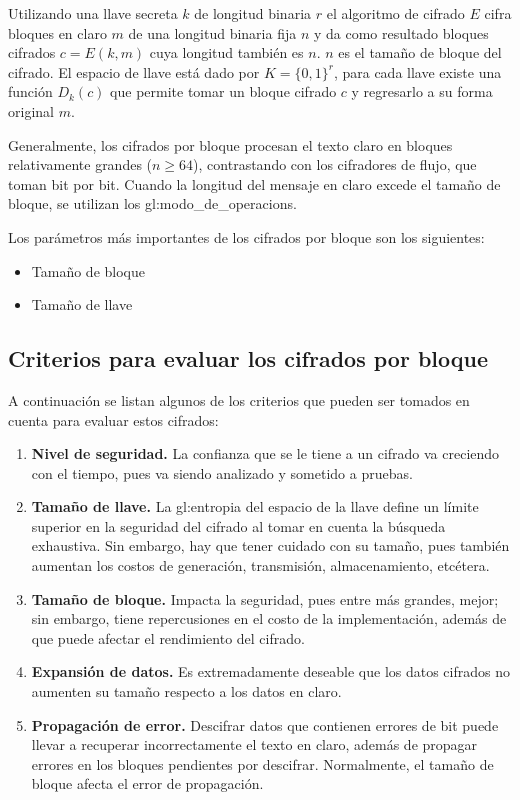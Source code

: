 Utilizando una llave secreta $k$ de longitud binaria $r$ el algoritmo de
cifrado $E$ cifra bloques en claro $m$ de una longitud binaria fija $n$ y
da como resultado bloques cifrados $c = E (k,m)$ cuya longitud también es
$n$. $n$ es el tamaño de bloque del cifrado.
El espacio de llave está dado por $K = \{0,1\}^r$, para cada llave existe una
función $D_k(c)$ que permite tomar un bloque cifrado $c$ y regresarlo a su
forma original $m$.

Generalmente, los cifrados por bloque procesan el texto claro en bloques
relativamente grandes ($n \geq 64$), contrastando con los cifradores de
flujo, que toman bit por bit. Cuando la longitud del mensaje en claro excede
el tamaño de bloque, se utilizan los \glspl{gl:modo_de_operacion}.

Los parámetros más importantes de los cifrados por bloque son los
siguientes:
\begin{itemize}
  \item Tamaño de bloque
  \item Tamaño de llave
\end{itemize}

\subsection{Criterios para evaluar los cifrados por bloque}

A continuación se listan algunos de los criterios que pueden ser tomados
en cuenta para evaluar estos cifrados:
\begin{enumerate}
  \item \textbf{Nivel de seguridad.} La confianza que se le tiene a un
    cifrado va creciendo con el tiempo, pues va siendo analizado y
    sometido a pruebas.
  \item \textbf{Tamaño de llave.} La \gls{gl:entropia} del espacio de la
    llave define un límite superior en la seguridad del cifrado al tomar en
    cuenta la búsqueda exhaustiva. Sin embargo, hay que tener cuidado
    con su tamaño, pues también aumentan los costos de generación,
    transmisión, almacenamiento, etcétera.
  \item \textbf{Tamaño de bloque.} Impacta la seguridad, pues entre más
    grandes, mejor; sin embargo, tiene repercusiones en el costo de la
    implementación, además de que puede afectar el rendimiento del
    cifrado.
  \item \textbf{Expansión de datos.} Es extremadamente deseable que los
    datos cifrados no aumenten su tamaño respecto a los datos en claro.
  \item \textbf{Propagación de error.} Descifrar datos que contienen
    errores de bit puede llevar a recuperar incorrectamente el texto en
    claro, además de propagar errores en los bloques pendientes por
    descifrar. Normalmente, el tamaño de bloque afecta el error de
    propagación.
\end{enumerate}


